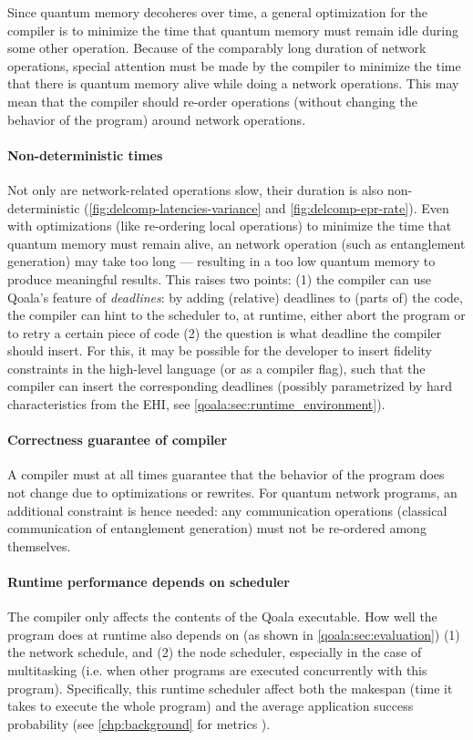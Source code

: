 Since quantum memory decoheres over time, a general optimization for the compiler is to minimize the time that quantum memory must remain idle during some other operation.
Because of the comparably long duration of network operations, special attention must be made by the compiler to minimize the time that there is quantum memory alive while doing a network operations.
This may mean that the compiler should re-order operations (without changing the behavior of the program) around network operations.

\paragraph{Non-deterministic times}
Not only are network-related operations slow, their duration is also non-deterministic (\cref{fig:delcomp-latencies-variance} and \cref{fig:delcomp-epr-rate}).
Even with optimizations (like re-ordering local operations) to minimize the time that quantum memory must remain alive, an network operation (such as entanglement generation) may take too long --- resulting in a too low quantum memory to produce meaningful results.
This raises two points:
(1) the compiler can use Qoala's feature of \emph{deadlines}: by adding (relative) deadlines to (parts of) the code, the compiler can hint to the scheduler to, at runtime, either abort the program or to retry a certain piece of code
(2) the question is what deadline the compiler should insert. For this, it may be possible for the developer to insert fidelity constraints in the high-level language (or as a compiler flag), such that the compiler can insert the corresponding deadlines (possibly parametrized by hard characteristics from the EHI, see \cref{qoala:sec:runtime_environment}).

\paragraph{Correctness guarantee of compiler}
A compiler must at all times guarantee that the behavior of the program does not change due to optimizations or rewrites.
For quantum network programs, an additional constraint is hence needed: any communication operations (classical communication of entanglement generation) must not be re-ordered among themselves.

\paragraph{Runtime performance depends on scheduler}
The compiler only affects the contents of the Qoala executable.
How well the program does at runtime also depends on (as shown in \cref{qoala:sec:evaluation})
(1) the network schedule, and (2) the node scheduler, especially in the case of multitasking (i.e. when other programs are executed concurrently with this program).
Specifically, this runtime scheduler affect both the makespan (time it takes to execute the whole program) and the average application success probability (see \cref{chp:background} for metrics ).

